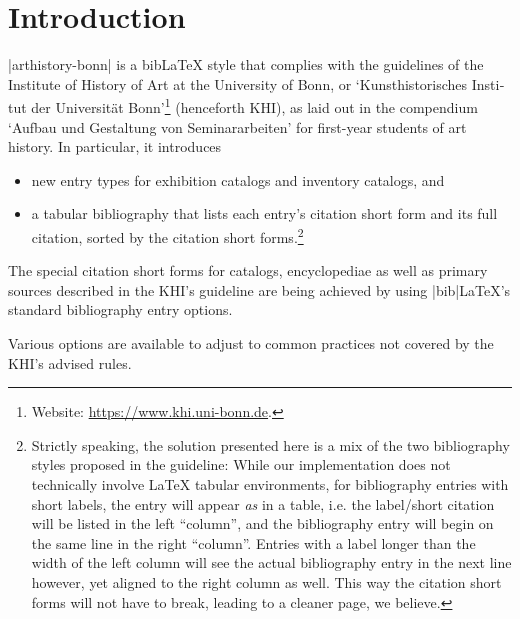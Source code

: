 \documentclass[a4paper,
10pt,
ngerman,
english
]{ltxdoc}
\begin{document}
\section{Introduction}
|arthistory-bonn| is a bib\LaTeX{} style that complies with the guidelines of the Institute of History of Art at the University of Bonn, or \foreignquote*{ngerman}{Kunsthistorisches Institut der Universität Bonn}\footnote{Website: \url{https://www.khi.uni-bonn.de}.} (henceforth KHI), as laid out in the compendium \foreignquote*{ngerman}{Aufbau und Gestaltung von Seminararbeiten} for first-year students of art history. In particular, it introduces
\begin{itemize}
	\item new entry types for exhibition catalogs and inventory catalogs, and
	\item a tabular bibliography that lists each entry's citation short form and its full citation, sorted by the citation short forms.\footnote{Strictly speaking, the solution presented here is a mix of the two bibliography styles proposed in the guideline: While our implementation does not technically involve \LaTeX{} tabular environments, for bibliography entries with short labels, the entry will appear \emph{as} in a table, i.e. the label/short citation will be listed in the left \enquote{column}, and the bibliography entry will begin on the same line in the right \enquote{column}. Entries with a label longer than the width of the left column will see the actual bibliography entry in the next line however, yet aligned to the right column as well. This way the citation short forms will not have to break, leading to a cleaner page, we believe.}
\end{itemize}
The special citation short forms for catalogs, encyclopediae as well as primary sources described in the KHI's guideline are being achieved by using |bib|\LaTeX's standard bibliography entry options.

Various options are available to adjust to common practices not covered by the KHI's advised rules.
\end{document}
